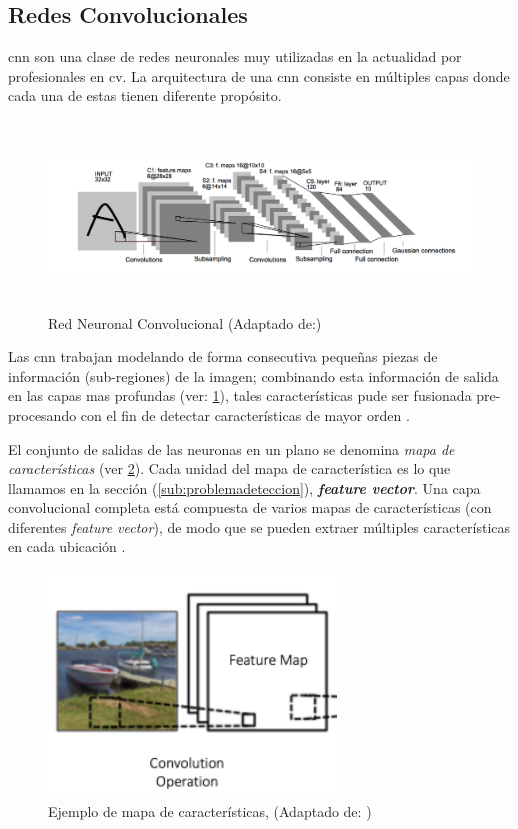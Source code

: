 \subsection{Redes Convolucionales}\label{sub:cnn}
\ac{cnn} son una clase de redes neuronales muy utilizadas en la actualidad por profesionales en \ac{cv}. La arquitectura de una \ac{cnn} consiste en múltiples capas donde cada una de estas tienen diferente propósito.

\begin{figure}[h]
 \centering
  \includegraphics[height=5cm,keepaspectratio=true,clip=true]{imagenes/Logos/cnnconv.png}
  \caption{Red Neuronal Convolucional (Adaptado de:\citep{cnns})}
	\label{Fig: redconvolucion}
\end{figure}

Las \ac{cnn} trabajan modelando de forma consecutiva pequeñas piezas de información (sub-regiones) de la imagen; combinando esta información de salida en las capas mas profundas (ver: \ref{Fig: redconvolucion}), tales características pude ser fusionada pre-procesando con el fin de detectar características de mayor orden \citep{murphy}.


El conjunto de salidas de las neuronas en un plano se denomina \textit{mapa de características} (ver \ref{Fig: fmaps}). Cada unidad  del mapa de característica es lo que llamamos en la sección (\ref{sub:problemadeteccion}),  \textit{\textbf{feature vector}}. Una capa convolucional completa está compuesta de varios mapas de características (con diferentes 
\textit{feature vector}), de modo que se pueden extraer múltiples características en cada ubicación \citep{cnns}.

\begin{figure}[H]
 \centering
  \includegraphics[height=6cm,keepaspectratio=true,clip=true]{imagenes/Logos/fmaps.png}
  \caption{Ejemplo de mapa de características, (Adaptado de: \citep{cnnsarticle})}
	\label{Fig: fmaps}
\end{figure}

